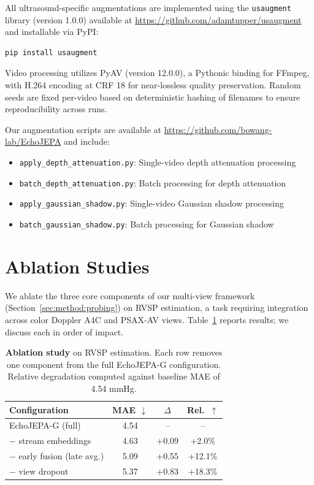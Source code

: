 \documentclass{article}
\theoremstyle{plain}
\theoremstyle{definition}
\theoremstyle{remark}
\begin{document}
All ultrasound-specific augmentations are implemented using the \texttt{usaugment} library (version 1.0.0) available at \url{https://github.com/adamtupper/usaugment} and installable via PyPI:

\begin{verbatim}
pip install usaugment
\end{verbatim}

Video processing utilizes PyAV (version 12.0.0), a Pythonic binding for FFmpeg, with H.264 encoding at CRF 18 for near-lossless quality preservation. Random seeds are fixed per-video based on deterministic hashing of filenames to ensure reproducibility across runs.

Our augmentation scripts are available at \url{https://github.com/bowang-lab/EchoJEPA} and include:
\begin{itemize}
    \item \texttt{apply\_depth\_attenuation.py}: Single-video depth attenuation processing
    \item \texttt{batch\_depth\_attenuation.py}: Batch processing for depth attenuation
    \item \texttt{apply\_gaussian\_shadow.py}: Single-video Gaussian shadow processing
    \item \texttt{batch\_gaussian\_shadow.py}: Batch processing for Gaussian shadow
\end{itemize}


\section{Ablation Studies}
\label{sec:exp:ablations}

We ablate the three core components of our multi-view framework (Section~\ref{sec:method:probing}) on RVSP estimation, a task requiring integration across color Doppler A4C and PSAX-AV views.
Table~\ref{tab:ablations} reports results; we discuss each in order of impact.

\begin{table}[h]
    \centering
    \caption{\textbf{Ablation study} on RVSP estimation. Each row removes one component from the full EchoJEPA-G configuration. Relative degradation computed against baseline MAE of 4.54 mmHg.}
    \label{tab:ablations}
    \vspace{0.5em}
    \small
    \begin{tabular}{@{}lccc@{}}
        \toprule
        \textbf{Configuration} & \textbf{MAE $\downarrow$} & \textbf{$\Delta$} & \textbf{Rel.\ $\uparrow$} \\
        \midrule
        EchoJEPA-G (full) & 4.54 & -- & -- \\
        \midrule
        \quad $-$ stream embeddings & 4.63 & +0.09 & +2.0\% \\
        \quad $-$ early fusion (late avg.) & 5.09 & +0.55 & +12.1\% \\
        \quad $-$ view dropout & 5.37 & +0.83 & +18.3\% \\
        \bottomrule
    \end{tabular}
\end{table}
\end{document}
